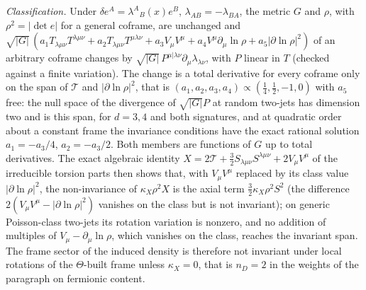 \emph{Classification.} Under \(\delta e^A=\lambda^A{}_B(x)e^B\), \(\lambda_{AB}=-\lambda_{BA}\), the metric \(G\) and \(\rho\), with \(\rho^2=\lvert\det e\rvert\) for a general coframe, are unchanged and \(\sqrt{\lvert G\rvert}\,(a_1T_{\lambda\mu\nu}T^{\lambda\mu\nu}+a_2T_{\lambda\mu\nu}T^{\mu\lambda\nu}+a_3V_\mu V^\mu+a_4V^\mu\partial_\mu\ln\rho+a_5\lvert\partial\ln\rho\rvert^2)\) of an arbitrary coframe changes by \(\sqrt{\lvert G\rvert}\,P^{\mu|\lambda\nu}\partial_\mu\lambda_{\lambda\nu}\), with \(P\) linear in \(T\) (checked against a finite variation). The change is a total derivative for every coframe only on the span of \(\mathcal T\) and \(\lvert\partial\ln\rho\rvert^2\), that is \((a_1,a_2,a_3,a_4)\propto(\tfrac14,\tfrac12,-1,0)\) with \(a_5\) free: the null space of the divergence of \(\sqrt{\lvert G\rvert}P\) at random two-jets has dimension two and is this span, for \(d=3,4\) and both signatures, and at quadratic order about a constant frame the invariance conditions have the exact rational solution \(a_1=-a_3/4\), \(a_2=-a_3/2\). Both members are functions of \(G\) up to total derivatives. The exact algebraic identity \(X=2\mathcal T+\tfrac32S_{\lambda\mu\nu}S^{\lambda\mu\nu}+2V_\mu V^\mu\) of the irreducible torsion parts then shows that, with \(V_\mu V^\mu\) replaced by its class value \(\lvert\partial\ln\rho\rvert^2\), the non-invariance of \(\kappa_X\rho^2X\) is the axial term \(\tfrac32\kappa_X\rho^2S^2\) (the difference \(2(V_\mu V^\mu-\lvert\partial\ln\rho\rvert^2)\) vanishes on the class but is not invariant); on generic Poisson-class two-jets its rotation variation is nonzero, and no addition of multiples of \(V_\mu-\partial_\mu\ln\rho\), which vanishes on the class, reaches the invariant span. The frame sector of the induced density is therefore not invariant under local rotations of the \(\Theta\)-built frame unless \(\kappa_X=0\), that is \(n_D=2\) in the weights of the paragraph on fermionic content.

